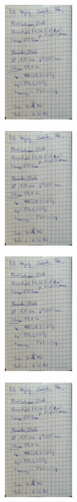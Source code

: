 \begin{minipage}[t]{0.4\textwidth}
    \includegraphics[height=5cm, page=5]{Inhalte/v103_messdaten.pdf}
\end{minipage}

\begin{minipage}[t]{0.4\textwidth}
    \includegraphics[height=5cm, page=6]{Inhalte/v103_messdaten.pdf}
\end{minipage}
\begin{minipage}[t]{0.4\textwidth}
    \includegraphics[height=5cm, page=7]{Inhalte/v103_messdaten.pdf}
\end{minipage}

\begin{minipage}[t]{0.4\textwidth}
    \includegraphics[height=5cm, page=8]{Inhalte/v103_messdaten.pdf}
\end{minipage}

